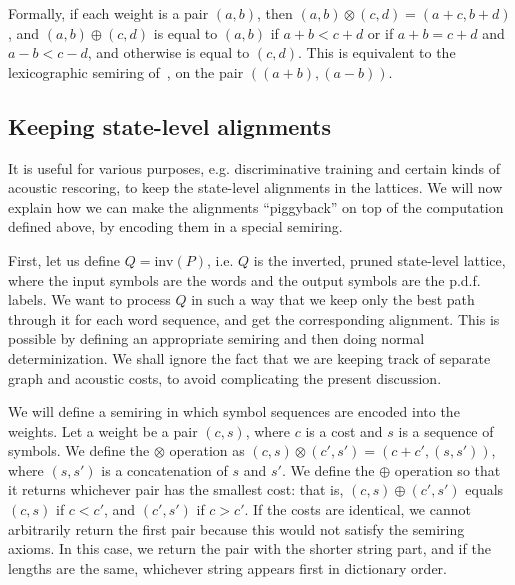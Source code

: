 \documentclass{article}
\def\inv{{\mathrm{inv}}}
\begin{document}
Formally, if each weight is a pair $(a,b)$, then $(a,b) \otimes (c,d) = (a{+}c, b{+}d)$,
and $(a,b) \oplus (c,d)$ is equal to $(a,b)$ if $a{+}b < c{+}d$ or if $a{+}b = c{+}d$ and $a{-}b < c{-}d$,
and otherwise is equal to $(c,d)$.  This is equivalent to the lexicographic semiring 
of~\cite{roark2011lexicographic}, on the pair $((a{+}b),(a{-}b))$.

\subsection{Keeping state-level alignments}

It is useful for various purposes, e.g. discriminative training and certain kinds of
acoustic rescoring, to keep the state-level alignments in the lattices.  We will now
explain how we can make the alignments ``piggyback'' on top of the computation
defined above, by encoding them in a special semiring.

First, let us define $Q = \inv(P)$, i.e. $Q$ is the inverted, pruned state-level lattice,
where the input symbols are the words and the output symbols are the p.d.f. labels.
We want to process $Q$ in such a way that we keep only the best path through it
for each word sequence, and get the corresponding alignment.  This is possible
by defining an appropriate semiring and then doing normal determinization.  We shall
ignore the fact that we are keeping track of separate graph and acoustic costs, 
to avoid complicating the present discussion.  

We will define a semiring in which symbol sequences are encoded into the weights.
Let a weight be a pair $(c, s)$, where $c$ is a cost and $s$ is a sequence of symbols.
We define the $\otimes$ operation as $(c, s) \otimes (c', s') = (c+c', (s,s'))$, where
$(s,s')$ is a concatenation of $s$ and $s'$.  We define the $\oplus$ operation so that
it returns whichever pair has the smallest cost: that is, $(c,s) \oplus (c',s')$ 
equals $(c,s)$ if $c < c'$, and $(c',s')$ if $c > c'$.  If the costs are identical,
we cannot arbitrarily return the first pair because this would not satisfy the semiring
axioms.  In this case, we return the pair with the shorter string part, and if
the lengths are the same, whichever string appears first in dictionary order. 
\end{document}
